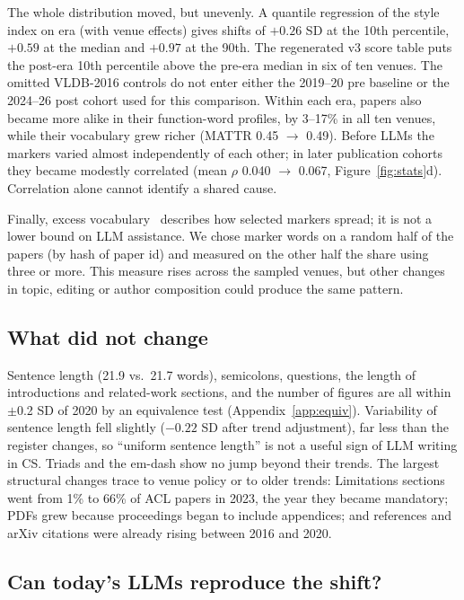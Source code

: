 \documentclass[10pt,twocolumn]{article}
\begin{document}
The whole distribution moved, but unevenly. A quantile regression of the style index on era (with venue effects) gives shifts of $+0.26$ SD at the 10th percentile, $+0.59$ at the median and $+0.97$ at the 90th. The regenerated v3 score table puts the post-era 10th percentile above the pre-era median in six of ten venues. The omitted VLDB-2016 controls do not enter either the 2019--20 pre baseline or the 2024--26 post cohort used for this comparison. Within each era, papers also became more alike in their function-word profiles, by 3--17\% in all ten venues, while their vocabulary grew richer (MATTR 0.45 $\to$ 0.49). Before LLMs the markers varied almost independently of each other; in later publication cohorts they became modestly correlated (mean $\rho$ 0.040 $\to$ 0.067, Figure~\ref{fig:stats}d). Correlation alone cannot identify a shared cause.

Finally, excess vocabulary~\citep{kobak2024delving} describes how selected markers spread; it is not a lower bound on LLM assistance. We chose marker words on a random half of the papers (by hash of paper id) and measured on the other half the share using three or more. This measure rises across the sampled venues, but other changes in topic, editing or author composition could produce the same pattern.

\subsection{What did not change}

Sentence length (21.9 vs.\ 21.7 words), semicolons, questions, the length of introductions and related-work sections, and the number of figures are all within $\pm$0.2 SD of 2020 by an equivalence test (Appendix~\ref{app:equiv}). Variability of sentence length fell slightly ($-0.22$ SD after trend adjustment), far less than the register changes, so ``uniform sentence length'' is not a useful sign of LLM writing in CS. Triads and the em-dash show no jump beyond their trends. The largest structural changes trace to venue policy or to older trends: Limitations sections went from 1\% to 66\% of ACL papers in 2023, the year they became mandatory; PDFs grew because proceedings began to include appendices; and references and arXiv citations were already rising between 2016 and 2020.

\subsection{Can today's LLMs reproduce the shift?}
\end{document}
